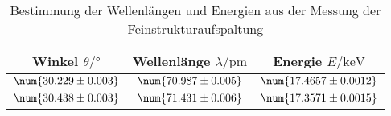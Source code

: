 \begin{table}[htbp]
   \centering
\caption{Bestimmung der Wellenlängen und Energien aus der Messung der Feinstrukturaufspaltung}
\begin{tabular}{c c c}
\hline Winkel $\theta/ \unit{\degree}$ & Wellenlänge $\lambda / \unit{\pm}$ & Energie $E / \unit{\kilo\electronvolt}$  \\ 
\hline
$\num{30.229\pm 0.003}$ & $\num{70.987\pm 0.005}$ & $\num{17.4657\pm 0.0012}$ \\
$\num{30.438\pm 0.003}$ & $\num{71.431\pm 0.006}$ & $\num{17.3571\pm 0.0015}$ \\
\hline\end{tabular}
\label{tab:feinstruktur}
\end{table}